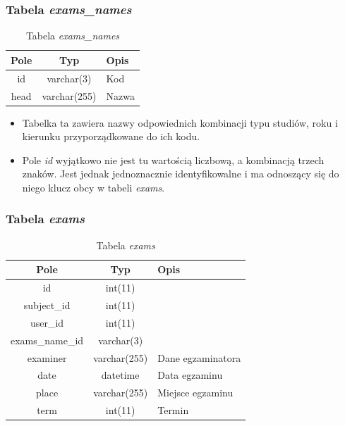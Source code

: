 \documentclass[a4paper,12pt,oneside]{report}
\begin{document}
\newpage

\subsubsection{Tabela \emph{exams\_names}}
\label{subsub:exams_names}

\begin{table}[h]
  \centering
  \begin{tabular}{|c|c|l|}\hline
  Pole & Typ & Opis \\\hline
  id   & varchar(3)   & Kod \\
  head & varchar(255) & Nazwa \\\hline
  \end{tabular}
  \caption{Tabela \emph{exams\_names}\label{tab:exams_names}}
\end{table}

\begin{itemize}
  \item Tabelka ta zawiera nazwy odpowiednich kombinacji typu studiów, roku i kierunku przyporządkowane do ich kodu.
  \item Pole \emph{id} wyjątkowo nie jest tu wartością liczbową, a kombinacją trzech znaków. Jest jednak jednoznacznie identyfikowalne i ma odnoszący się do niego klucz obcy w tabeli \emph{exams}.
\end{itemize}

\subsubsection{Tabela \emph{exams}}
\label{subsub:exams}

\begin{table}[h]
  \centering
  \begin{tabular}{|c|c|l|}\hline
  Pole & Typ & Opis \\\hline
  id   & int(11)   &  \\
  subject\_id     & int(11)      & \\
  user\_id        & int(11)      & \\
  exams\_name\_id & varchar(3)   & \\
  examiner        & varchar(255) & Dane egzaminatora \\
  date            & datetime     & Data egzaminu \\
  place           & varchar(255) & Miejsce egzaminu \\
  term            & int(11)      & Termin \\\hline

  \end{tabular}
  \caption{Tabela \emph{exams}\label{tab:exams}}
\end{table}
\end{document}
